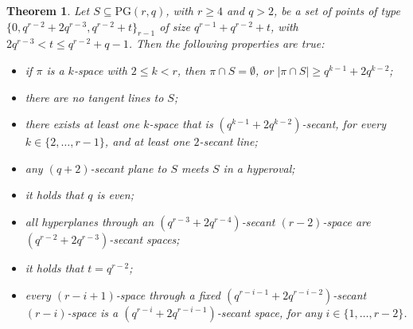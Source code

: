 \documentclass[11pt]{amsart}
\newtheorem{theorem}{Theorem}[section]
\newcommand{\PG}{\mathrm{PG}}
\begin{document}
\begin{theorem} \label{th:propgenkmarcspace}
Let $S \subseteq \PG(r,q)$, with $r\geq 4$ and $q>2$, be a set of points of type $\{0,q^{r-2}+2q^{r-3},q^{r-2}+t\}_{r-1}$  of size $q^{r-1}+q^{r-2}+t$, with $2q^{r-3}< t \leq q^{r-2}+q-1$. Then the following properties are true:
\begin{itemize}
    \item[(i)] if $\pi$ is a $k$-space with $2 \leq k < r$, then $\pi \cap S = \emptyset$, or $|\pi \cap S| \geq q^{k-1}+2q^{k-2}$;
    \item[(ii)] there are no tangent lines to $S$;
    \item[(iii)] there exists at least one $k$-space that is $(q^{k-1}+2q^{k-2})$-secant, for every $k \in \{2,\ldots,r-1\}$, and at least one $2$-secant line; 
    \item[(iv)] any $(q+2)$-secant plane to $S$ meets $S$ in a hyperoval;
    \item[(v)] it holds that $q$ is even;
    \item[(vi)] all hyperplanes through an $(q^{r-3}+2q^{r-4})$-secant $(r-2)$-space are $(q^{r-2}+2q^{r-3})$-secant spaces; 
    \item[(vii)] it holds that $t=q^{r-2}$;
    \item[(viii)] every $(r-i+1)$-space through a fixed $(q^{r-i-1}+2q^{r-i-2})$-secant $(r-i)$-space is a $(q^{r-i}+2q^{r-i-1})$-secant space, for any $i \in \{1,\ldots,r-2\}$. 
\end{itemize}
\end{theorem}
\end{document}
